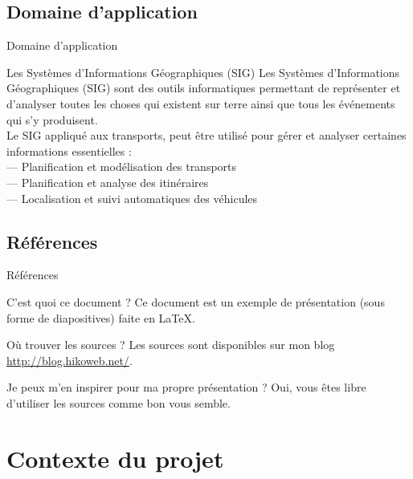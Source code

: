 \documentclass[utf8,compress]{beamer}
\begin{document}
\subsection{Domaine d'application}
\begin{frame}{Domaine d'application}
\begin{block}{Les Systèmes d’Informations Géographiques (SIG)}
Les Systèmes d’Informations Géographiques (SIG) sont des outils informatiques permettant
de représenter et d’analyser toutes les choses qui existent sur terre ainsi que tous les événements
qui s’y produisent. \\
Le SIG appliqué aux transports, peut être utilisé
pour gérer et analyser certaines informations essentielles :\\
— Planification et modélisation des transports\\
— Planification et analyse des itinéraires\\
— Localisation et suivi automatiques des véhicules\\
\end{block}
\end{frame}
\subsection{Références}
\begin{frame}{Références}
\begin{block}{C'est quoi ce document ?}
    Ce document est un exemple de présentation (sous forme de diapositives) faite en LaTeX.
\end{block}
\begin{block}{Où trouver les sources ?}
    Les sources sont disponibles sur mon blog \url{http://blog.hikoweb.net/}.
\end{block}
\begin{block}{Je peux m'en inspirer pour ma propre présentation ?}
    Oui, vous êtes libre d'utiliser les sources comme bon vous semble.
\end{block}
\end{frame}


\section{Contexte du projet}
\end{document}
